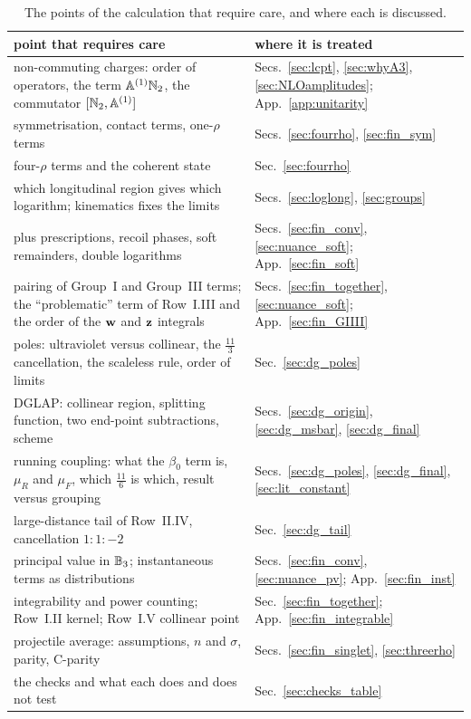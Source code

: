 \begin{table}[t]
\centering
\renewcommand{\arraystretch}{1.2}
\footnotesize
\begin{tabular}{@{}>{\raggedright\arraybackslash}p{}>{\raggedright\arraybackslash}p{}@{}}
\toprule
point that requires care & where it is treated\\
\midrule
non-commuting charges: order of operators, the term $\mathbb{A}^{(1)}\mathbb{N}_2$, the commutator $[\mathbb{N}_2,\mathbb{A}^{(1)}]$ & Secs.~\ref{sec:lcpt}, \ref{sec:whyA3}, \ref{sec:NLOamplitudes}; App.~\ref{app:unitarity}\\
symmetrisation, contact terms, one-$\rho$ terms & Secs.~\ref{sec:fourrho}, \ref{sec:fin_sym}\\
four-$\rho$ terms and the coherent state & Sec.~\ref{sec:fourrho}\\
which longitudinal region gives which logarithm; kinematics fixes the limits & Secs.~\ref{sec:loglong}, \ref{sec:groups}\\
plus prescriptions, recoil phases, soft remainders, double logarithms & Secs.~\ref{sec:fin_conv}, \ref{sec:nuance_soft}; App.~\ref{sec:fin_soft}\\
pairing of Group~I and Group~III terms; the ``problematic'' term of Row~I.III and the order of the $\mathbf{w}$ and $\mathbf{z}$ integrals & Secs.~\ref{sec:fin_together}, \ref{sec:nuance_soft}; App.~\ref{sec:fin_GIIII}\\
poles: ultraviolet versus collinear, the $\frac{11}{3}$ cancellation, the scaleless rule, order of limits & Sec.~\ref{sec:dg_poles}\\
DGLAP: collinear region, splitting function, two end-point subtractions, scheme & Secs.~\ref{sec:dg_origin}, \ref{sec:dg_msbar}, \ref{sec:dg_final}\\
running coupling: what the $\beta_0$ term is, $\mu_R$ and $\mu_F$, which $\frac{11}{6}$ is which, result versus grouping & Secs.~\ref{sec:dg_poles}, \ref{sec:dg_final}, \ref{sec:lit_constant}\\
large-distance tail of Row~II.IV, cancellation $1:1:-2$ & Sec.~\ref{sec:dg_tail}\\
principal value in $\mathbb{B}_3$; instantaneous terms as distributions & Secs.~\ref{sec:fin_conv}, \ref{sec:nuance_pv}; App.~\ref{sec:fin_inst}\\
integrability and power counting; Row~I.II kernel; Row~I.V collinear point & Sec.~\ref{sec:fin_together}; App.~\ref{sec:fin_integrable}\\
projectile average: assumptions, $n$ and $\sigma$, parity, C-parity & Secs.~\ref{sec:fin_singlet}, \ref{sec:threerho}\\
the checks and what each does and does not test & Sec.~\ref{sec:checks_table}\\
\bottomrule
\end{tabular}
\caption{The points of the calculation that require care, and where each is discussed.}
\label{tab:nuances}
\end{table}

